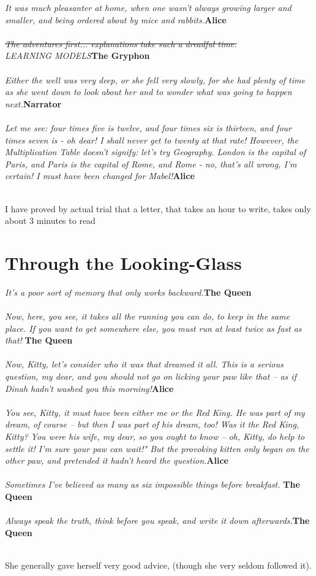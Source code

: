 \documentclass{hi-thesis}
\renewcommand{\quote}[2]{\noindent \emph{#2}\hfill{\bf #1}\\\\}
\begin{document}
\quote{Alice}{It was much pleasanter at home, when one wasn't always growing larger and smaller, and being ordered about by mice and rabbits.}
\quote{The Gryphon}{\st{The adventures first... explanations take such a dreadful time.}\\LEARNING MODELS}
\quote{Narrator}{Either the well was very deep, or she fell very slowly, for she had plenty of time as she went down to look about her and to wonder what was going to happen next.}
\quote{Alice}{Let me see: four times five is twelve, and four times six is thirteen, and four times seven is - oh dear! I shall never get to twenty at that rate! However, the Multiplication Table doesn't signify: let's try Geography. London is the capital of Paris, and Paris is the capital of Rome, and Rome - no, that's all wrong, I'm certain! I must have been changed for Mabel!}


\begin{savequote}[75mm] 
I have proved by actual trial that a letter, that takes an hour to write, takes only about 3 minutes to read
\end{savequote}

\chapter*{Through the Looking-Glass}
\quote{The Queen}{It's a poor sort of memory that only works backward.}
\quote{The Queen}{Now, here, you see, it takes all the running you can do, to keep in the same place. If you want to get somewhere else, you must run at least twice as fast as that! }
\quote{Alice}{Now, Kitty, let's consider who it was that dreamed it all. This is a serious question, my dear, and you should not go on licking your paw like that -- as if Dinah hadn't washed you this morning!}
\quote{Alice}{You see, Kitty, it must have been either me or the Red King. He was part of my dream, of course -- but then I was part of his dream, too! Was it the Red King, Kitty? You were his wife, my dear, so you ought to know -- oh, Kitty, do help to settle it! I'm sure your paw can wait!" But the provoking kitten only began on the other paw, and pretended it hadn't heard the question.}
\quote{The Queen}{Sometimes I've believed as many as six impossible things before breakfast. }
\quote{The Queen}{Always speak the truth, think before you speak, and write it down afterwards.}








\begin{savequote}[75mm] 
She generally gave herself very good advice, (though she very seldom followed it).
\end{savequote}


 

\end{document}
